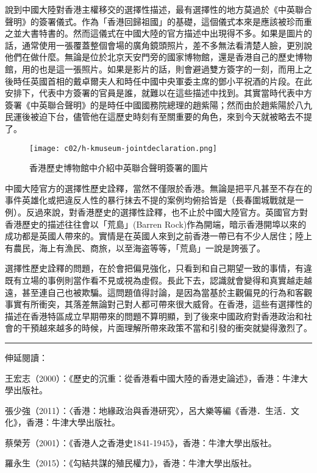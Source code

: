 說到中國大陸對香港主權移交的選擇性描述，最有選擇性的地方莫過於《中英聯合聲明》的簽署儀式。作為「香港回歸祖國」的基礎，這個儀式本來是應該被珍而重之並大書特書的。然而這儀式在中國大陸的官方描述中出現得不多。如果是圖片的話，通常使用一張覆蓋整個會場的廣角鏡頭照片，差不多無法看清楚人臉，更別說他們在做什麼。無論是位於北京天安門旁的國家博物館，還是香港自己的歷史博物館，用的也是這一張照片。如果是影片的話，則會避過雙方簽字的一刻，而用上之後時任英國首相的戴卓爾夫人和時任中國中央軍委主席的鄧小平祝酒的片段。在此安排下，代表中方簽署的官員是誰，就難以在這些描述中找到。其實當時代表中方簽署《中英聯合聲明》的是時任中國國務院總理的趙紫陽；然而由於趙紫陽於八九民運後被迫下台，儘管他在這歷史時刻有至關重要的角色，來到今天就被略去不提了。

\begin{figure}[htbp]
    \centering
    \texttt{[image: c02/h-kmuseum-jointdeclaration.png]}
    \caption{香港歷史博物館中介紹中英聯合聲明簽署的圖片} 
\end{figure}

中國大陸官方的選擇性歷史詮釋，當然不僅限於香港。無論是把平凡甚至不存在的事件英雄化或把違反人性的暴行抹去不提的案例均俯拾皆是（長春圍城戰就是一例）。反過來說，對香港歷史的選擇性詮釋，也不止於中國大陸官方。英國官方對香港歷史的描述往往會以「荒島」(Barren Rock)作為開端，暗示香港開埠以來的成功都是英國人帶來的。實情是在英國人來到之前香港一帶已有不少人居住；陸上有農民，海上有漁民、商旅，以至海盗等等，「荒島」一說是誇張了。

選擇性歷史詮釋的問題，在於會把偏見強化，只看到和自己期望一致的事情，有違既有立場的事例則當作看不見或視為虛假。長此下去，認識就會變得和真實越走越遠，甚至連自己也被欺騙。這問題值得討論，是因為當基於主觀偏見的行為和客觀事實有所衝突，其落差無論對己對人都可帶來很大威脅。在香港，這些有選擇性的描述在香港特區成立早期帶來的問題不算明顯，到了後來中國政府對香港政治和社會的干預越來越多的時候，片面理解所帶來政策不當和引發的衝突就變得激烈了。

\rule[-10pt]{15cm}{0.05em}

伸延閱讀：

王宏志（2000）：《歷史的沉重：從香港看中國大陸的香港史論述》，香港：牛津大學出版社。

張少強（2011）：〈香港：地緣政治與香港研究〉，呂大樂等編《香港．生活．文化》，香港：牛津大學出版社。

蔡榮芳（2001）：《香港人之香港史1841-1945》，香港：牛津大學出版社。

羅永生（2015）：《勾結共謀的殖民權力》，香港：牛津大學出版社。
